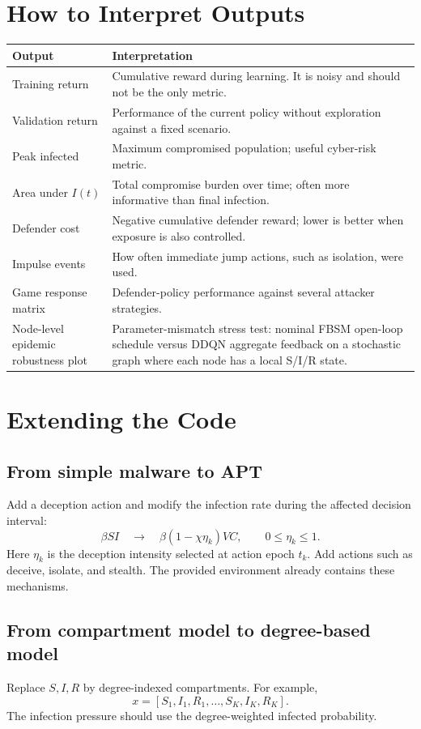 \documentclass[11pt,a4paper]{article}
\begin{document}
\section{How to Interpret Outputs}
\begin{longtable}{p{}p{}}
\toprule
Output & Interpretation \\
\midrule
Training return & Cumulative reward during learning. It is noisy and should not be the only metric. \\
Validation return & Performance of the current policy without exploration against a fixed scenario. \\
Peak infected & Maximum compromised population; useful cyber-risk metric. \\
Area under $I(t)$ & Total compromise burden over time; often more informative than final infection. \\
Defender cost & Negative cumulative defender reward; lower is better when exposure is also controlled. \\
Impulse events & How often immediate jump actions, such as isolation, were used. \\
Game response matrix & Defender-policy performance against several attacker strategies. \\
Node-level epidemic robustness plot & Parameter-mismatch stress test: nominal FBSM open-loop schedule versus DDQN aggregate feedback on a stochastic graph where each node has a local S/I/R state. \\
\bottomrule
\end{longtable}

\section{Extending the Code}
\subsection{From simple malware to APT}
Add a deception action and modify the infection rate during the affected decision interval:
\begin{equation}
\beta SI\quad \rightarrow\quad \beta(1-\chi\eta_k)VC,\qquad 0\leq\eta_k\leq 1.
\end{equation}
Here $\eta_k$ is the deception intensity selected at action epoch $t_k$. Add actions such as deceive, isolate, and stealth. The provided environment already contains these mechanisms.

\subsection{From compartment model to degree-based model}
Replace $S,I,R$ by degree-indexed compartments. For example,
\begin{equation}
x=[S_1,I_1,R_1,\ldots,S_K,I_K,R_K].
\end{equation}
The infection pressure should use the degree-weighted infected probability.
\end{document}
